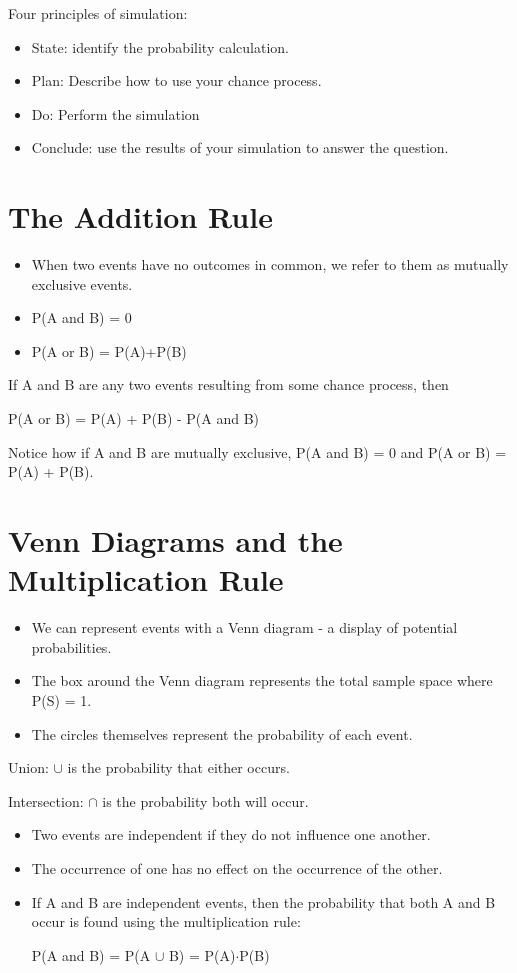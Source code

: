 \documentclass[../stats.tex]{subfiles}
\begin{document}
Four principles of simulation:
\begin{itemize}
    \item State: identify the probability calculation.
    \item Plan: Describe how to use your chance process.
    \item Do: Perform the simulation 
    \item Conclude: use the results of your simulation to answer the question.
\end{itemize}
\section{The Addition Rule}
\begin{itemize}
    \item When two events have no outcomes in common, we refer to them as mutually exclusive events.
    \item P(A and B) = 0
    \item P(A or B) = P(A)+P(B)
\end{itemize}

If A and B are any two events resulting from some chance process, then
\begin{center}
    P(A or B) = P(A) + P(B) - P(A and B)
\end{center}
Notice how if A and B are mutually exclusive, P(A and B) = 0 and P(A or B) = P(A) + P(B).


\section{Venn Diagrams and the Multiplication Rule}
\begin{itemize}
    \item We can represent events with a Venn diagram - a display of potential probabilities.
    \item The box around the Venn diagram represents the total sample space where P(S) = 1.
    \item The circles themselves represent the probability of each event.
\end{itemize}

Union: $\cup$ is the probability that either occurs.

Intersection: $\cap$ is the probability both will occur.

\begin{itemize}
    \item Two events are independent if they do not influence one another.
    \item The occurrence of one has no effect on the occurrence of the other.
    \item If A and B are independent events, then the probability that both A and B occur is found using the multiplication rule:
    \begin{center}
        P(A and B) = P(A $\cup$ B) = P(A)$\cdot$P(B)
    \end{center}
\end{itemize}
\end{document}
